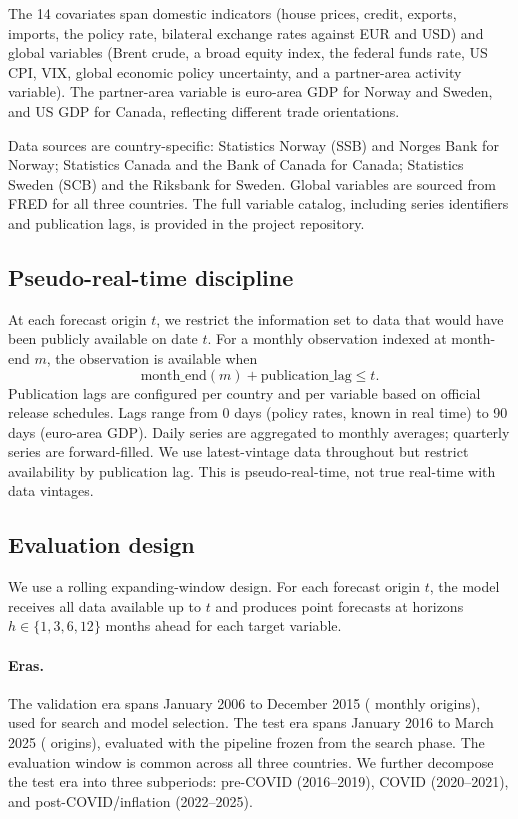 \documentclass[12pt,a4paper]{article}
\begin{document}
The 14 covariates span domestic indicators (house prices, credit, exports, imports, the policy rate, bilateral exchange rates against EUR and USD) and global variables (Brent crude, a broad equity index, the federal funds rate, US CPI, VIX, global economic policy uncertainty, and a partner-area activity variable). The partner-area variable is euro-area GDP for Norway and Sweden, and US GDP for Canada, reflecting different trade orientations.

Data sources are country-specific: Statistics Norway (SSB) and Norges Bank for Norway; Statistics Canada and the Bank of Canada for Canada; Statistics Sweden (SCB) and the Riksbank for Sweden. Global variables are sourced from FRED for all three countries. The full variable catalog, including series identifiers and publication lags, is provided in the project repository.

\subsection{Pseudo-real-time discipline}
\label{sec:realtime}

At each forecast origin $t$, we restrict the information set to data that would have been publicly available on date $t$. For a monthly observation indexed at month-end $m$, the observation is available when
\begin{equation}
    \text{month\_end}(m) + \text{publication\_lag} \leq t.
\end{equation}
Publication lags are configured per country and per variable based on official release schedules. Lags range from 0 days (policy rates, known in real time) to 90 days (euro-area GDP). Daily series are aggregated to monthly averages; quarterly series are forward-filled. We use latest-vintage data throughout but restrict availability by publication lag. This is pseudo-real-time, not true real-time with data vintages.

\subsection{Evaluation design}
\label{sec:evaluation}

We use a rolling expanding-window design. For each forecast origin $t$, the model receives all data available up to $t$ and produces point forecasts at horizons $h \in \{1, 3, 6, 12\}$ months ahead for each target variable.

\paragraph{Eras.} The validation era spans January 2006 to December 2015 (\nValOrigins{} monthly origins), used for search and model selection. The test era spans January 2016 to March 2025 (\nTestOrigins{} origins), evaluated with the pipeline frozen from the search phase. The evaluation window is common across all three countries. We further decompose the test era into three subperiods: pre-COVID (2016--2019), COVID (2020--2021), and post-COVID/inflation (2022--2025).
\end{document}
